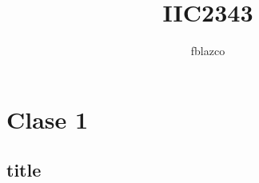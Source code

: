 \documentclass{article}
\author{fblazco}
\title{IIC2343}
\begin{document}
	\maketitle
    \section{Clase 1}
    \subsection*{title}
\end{document}
